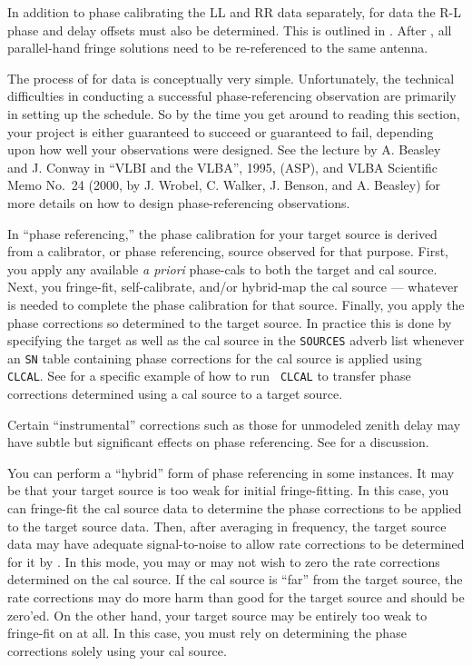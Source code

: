 
In addition to phase calibrating the LL and RR data separately, for
 data the R-L phase and delay offsets must also be
determined.  This is outlined in \@.  After
, all parallel-hand fringe solutions need to be
re-referenced to the same antenna.

\vfill\eject
{}

The process of  for  data is
conceptually very simple.  Unfortunately, the technical difficulties
in conducting a successful phase-referencing observation are primarily
in setting up the schedule.  So by the time you get around to reading
this section, your project is either guaranteed to succeed or
guaranteed to fail, depending upon how well your observations were
designed.  See the lecture by A. Beasley and J. Conway in ``VLBI and
the VLBA'', 1995, (ASP), and VLBA Scientific Memo No.~24 (2000, by J.
Wrobel, C. Walker, J. Benson, and A. Beasley) for more details on how
to design phase-referencing observations.

In ``phase referencing,'' the phase calibration for your target source
is derived from a calibrator, or phase referencing, source observed
for that purpose.  First, you apply any available {\it a priori\/}
phase-cals to both the target and cal source.  Next, you fringe-fit,
self-calibrate, and/or hybrid-map the cal source --- whatever is
needed to complete the phase calibration for that source. Finally, you
apply the phase corrections so determined to the target source.  In
practice this is done by specifying the target as well as the cal
source in the {\tt SOURCES} adverb list whenever an {\tt SN} table
containing phase corrections for the cal source is applied using {\tt
CLCAL}\@.  See  for a specific example of how to run {\tt
CLCAL} to transfer phase corrections determined using a cal source to
a target source.

Certain ``instrumental'' corrections such as those for unmodeled
zenith delay may have subtle but significant effects on phase
referencing.  See  for a discussion.

You can perform a ``hybrid'' form of phase referencing in some
instances.  It may be that your target source is too weak for initial
fringe-fitting.  In this case, you can fringe-fit the cal source data
to determine the phase corrections to be applied to the target source
data.  Then, after averaging in frequency, the target source data may
have adequate signal-to-noise to allow rate corrections to be
determined for it by .  In this mode, you may or
may not wish to zero the rate corrections determined on the cal
source.  If the cal source is ``far'' from the target source, the rate
corrections may do more harm than good for the target source and
should be zero'ed.  On the other hand, your target source may be
entirely too weak to fringe-fit on at all.  In this case, you must
rely on determining the phase corrections solely using your cal
source.

